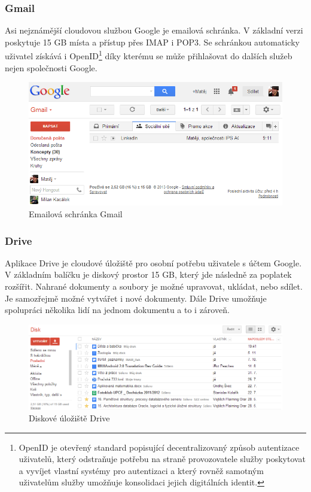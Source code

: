 \subsubsection{Gmail}
Asi nejznámější cloudovou službou Google je emailová schránka. V základní verzi poskytuje 15 GB místa a přístup přes IMAP i POP3. Se schránkou automaticky uživatel získává i OpenID\footnote{OpenID je otevřený standard popisující decentralizovaný způsob autentizace uživatelů, který odstraňuje potřebu na straně provozovatele služby poskytovat a vyvíjet vlastní systémy pro autentizaci a který rovněž samotným uživatelům služby umožňuje konsolidaci jejich digitálních identit.\cite{wiki:openID}} díky kterému se může přihlašovat do dalších služeb nejen společnosti Google.
\begin{figure}[htbp]
	\centering
		\includegraphics[width=1.00\textwidth]{ext/googleGmail.png}
	\caption{Emailová schránka Gmail}
	\label{fig:googleGmail}
\end{figure}

\subsubsection{Drive}
Aplikace Drive je cloudové úložiště pro osobní potřebu uživatele s účtem Google. V základním balíčku je diskový prostor 15 GB, který jde následně za poplatek rozšířit. Nahrané dokumenty a soubory je možné upravovat, ukládat, nebo sdílet. Je samozřejmě možné vytvářet i nové dokumenty. Dále Drive umožňuje spolupráci několika lidí na jednom dokumentu a to i zároveň.
\begin{figure}[htbp]
	\centering
		\includegraphics[width=1.00\textwidth]{ext/googleDrive.png}
	\caption{Diskové úložiště Drive}
	\label{fig:googleDrive}
\end{figure}

